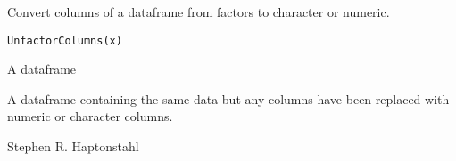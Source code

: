 \documentclass[a4paper]{book}
\begin{document}
%
\begin{Description}\relax
Convert columns of a dataframe from factors to character or numeric.
\end{Description}
%
\begin{Usage}
\begin{verbatim}
UnfactorColumns(x)
\end{verbatim}
\end{Usage}
%
\begin{Arguments}
\begin{ldescription}
\item[\code{x}] A dataframe
\end{ldescription}
\end{Arguments}
%
\begin{Value}
A dataframe containing the same data but any  columns have been replaced with numeric or character columns.
\end{Value}
%
\begin{Author}\relax
Stephen R. Haptonstahl 
\end{Author}
\printindex{}
\end{document}
